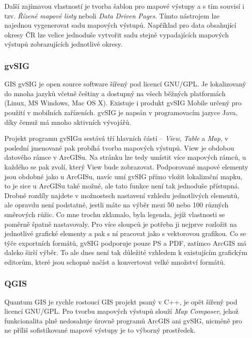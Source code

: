 \documentclass[a4paper,12pt,draft]{article}
\begin{document}
Další zajímavou vlastností je tvorba šablon pro mapové výstupy a
s tím souvisí i tzv. \emph{Řízené mapové listy} neboli \emph{Data
Driven Pages}. Tímto nástrojem lze najednou vygenerovat sadu mapových
výstupů. Například pro data obsahující okresy ČR lze velice jednoduše
vytvořit sadu stejně vypadajících mapových výstupů zobrazujících
jednotlivé okresy.


\subsubsection{gvSIG}
GIS gvSIG je open source software šířený pod licencí GNU/GPL. Je
lokalizovaný do mnoha jazyků včetně češtiny a dostupný na všech
běžných platformách (Linux, MS Windows, Mac OS X). Existuje i produkt gvSIG
Mobile určený pro použití v mobilních zařízeních. gvSIG je napsán
v programovacím jazyce Java, díky čemuž má mnoho aktivních vývojářů.

Projekt programu gvSIGu sestává tří hlavních částí -- \emph{View},
\emph{Table} a \emph{Map}, v poslední jmenované pak probíhá tvorba
mapových výstupů. View je obdobou datového rámce v ArcGISu. Na stránku
lze tedy umístit více mapových rámců, u každého se pak zvolí,
který View bude zobrazovat. Podporované mapové elementy jsou obdobné
jako u ArcGISu, navíc umí gvSIG přímo vložit lokalizační mapku,
to je sice u ArcGISu také možné, ale tato funkce není tak jednoduše
přístupná. Drobné rozdíly najdete v možnostech nastavení vzhledu
jednotlivých elementů, ale opravdu není podstatné, jestli máte na výběr
mezi 50 nebo 100 různých směrových růžic. Co mne trochu zklamalo,
byla legenda, jejíž vlastnosti se poměrně špatně nastavovaly. Pro
více sloupců je potřeba ji nejprve rozložit na jednotlivé grafické
elementy a pak s ní pracovat jako s vektorovou grafikou. Co se týče
exportních formátů, gvSIG podporuje pouze PS a PDF, zatímco ArcGIS
má daleko širší výběr. To ale dnes není tak důležité vzhledem
k existujícím grafickým editorům, které jsou schopné načíst a
konvertovat velké množství formátů.

\subsubsection{QGIS}
Quantum GIS je rychle rostoucí GIS projekt psaný v C++, je opět šířený
pod licencí GNU/GPL. Pro tvorbu mapových výstupů slouží \emph{Map
Composer}, jehož funkcionalita plně nedosahuje úrovně programů ArcGIS
ani gvSIG, nicméně pro ne příliš sofistikované mapové výstupy je to
výborný prostředek.
\end{document}
